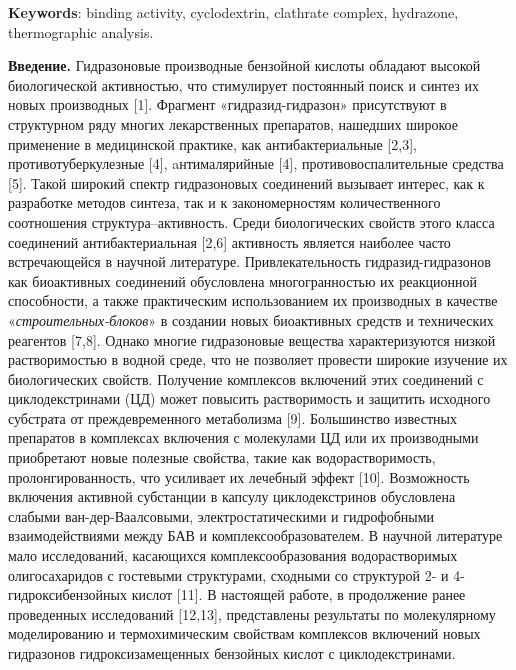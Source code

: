 {\bfseries Keywords}: binding activity, cyclodextrin, clathrate complex,
hydrazone, thermographic analysis.
\vspace{-1em}
\begin{multicols}{2}
{\bfseries Введение.} Гидразоновые производные бензойной кислоты обладают
высокой биологической активностью, что стимулирует постоянный поиск и
синтез их новых производных {[}1{]}. Фрагмент «гидразид-гидразон»
присутствуют в структурном ряду многих лекарственных препаратов,
нашедших широкое применение в медицинской практике, как
антибактериальные {[}2,3{]}, противотуберкулезные {[}4{]},
aнтималярийные {[}4{]}, противовоспалительные средства {[}5{]}. Такой
широкий спектр гидразоновых соединений вызывает интерес, как к
разработке методов синтеза, так и к закономерностям количественного
соотношения структура--активность. Среди биологических свойств этого
класса соединений антибактериальная {[}2,6{]} активность является
наиболее часто встречающейся в научной литературе. Привлекательность
гидразид-гидразонов как биоактивных соединений обусловлена
многогранностью их реакционной способности, а также практическим
использованием их производных в качестве «\emph{строительных-блоков}» в
создании новых биоактивных средств и технических реагентов {[}7,8{]}.
Однако многие гидразоновые вещества характеризуются низкой
растворимостью в водной среде, что не позволяет провести широкие
изучение их биологических свойств. Получение комплексов включений этих
соединений с циклодекстринами (ЦД) может повысить растворимость и
защитить исходного субстрата от преждевременного метаболизма {[}9{]}.
Большинство известных препаратов в комплексах включения с молекулами ЦД
или их производными приобретают новые полезные свойства, такие как
водорастворимость, пролонгированность, что усиливает их лечебный эффект
{[}10{]}. Возможность включения активной субстанции в капсулу
циклодекстринов обусловлена слабыми ван-дер-Ваалсовыми,
электростатическими и гидрофобными взаимодействиями между БАВ и
комплексообразователем. В научной литературе мало исследований,
касающихся комплексообразования водорастворимых олигосахаридов с
гостевыми структурами, сходными со структурой 2- и 4-гидроксибензойных
кислот {[}11{]}. В настоящей работе, в продолжение ранее проведенных
исследований {[}12,13{]}, представлены результаты по молекулярному
моделированию и термохимическим свойствам комплексов включений новых
гидразонов гидроксизамещенных бензойных кислот с циклодекстринами.


\end{multicols}
